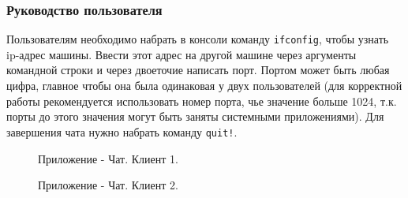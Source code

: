 \documentclass[a4paper,14pt]{extarticle}
\begin{document}
\subsubsection{Руководство пользователя}
Пользователям необходимо набрать в консоли команду \verb|ifconfig|, чтобы узнать ip-адрес машины. Ввести этот адрес на другой машине через аргументы командной строки и через двоеточие написать порт. Портом может быть любая цифра, главное чтобы она была одинаковая у двух пользователей (для корректной работы рекомендуется использовать номер порта, чье значение больше 1024, т.к. порты до этого значения могут быть заняты системными приложениями). Для завершения чата нужно набрать команду \verb|quit!|.
\begin{figure}[h!]
\caption{Приложение - Чат. Клиент 1.}
\label{1.png}
\end{figure}

\begin{figure}[H]
\caption{Приложение - Чат. Клиент 2.}
\label{1.png}
\end{figure}
\end{document}
